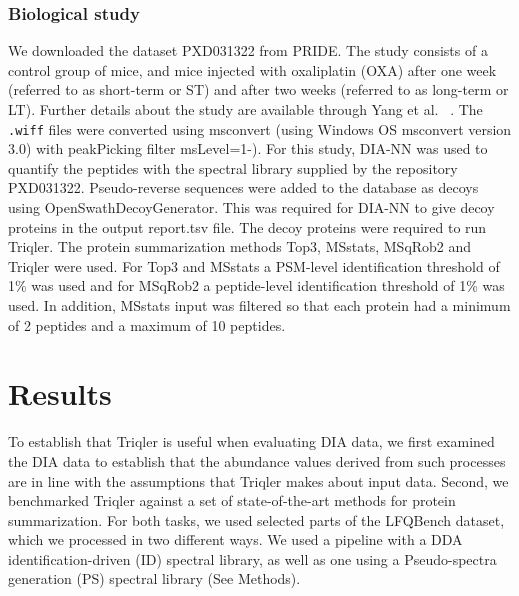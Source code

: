 \documentclass[10pt,letterpaper]{article}
\begin{document}

\subsubsection*{Biological study}

We downloaded the dataset PXD031322 from PRIDE. The study consists of a control group of mice, and mice injected with oxaliplatin (OXA) after one week (referred to as short-term or ST) and after two weeks (referred to as long-term or LT). Further details about the study are available through Yang et al. ~\cite{YANG2022104682}. The \verb|.wiff| files were converted using msconvert (using Windows OS msconvert version 3.0) with peakPicking filter msLevel=1-). For this study, DIA-NN was used to quantify the peptides with the spectral library supplied by the repository PXD031322. Pseudo-reverse sequences were added to the database as decoys using OpenSwathDecoyGenerator. This was required for DIA-NN to give decoy proteins in the output report.tsv file. The decoy proteins were required to run Triqler. The protein summarization methods Top3, MSstats, MSqRob2 and Triqler were used. For Top3 and MSstats a PSM-level identification threshold of 1\% was used and for MSqRob2 a peptide-level identification threshold of 1\% was used. In addition, MSstats input was filtered so that each protein had a minimum of 2 peptides and a maximum of 10 peptides. 

\section*{Results}

To establish that Triqler is useful when evaluating DIA data, we first examined the DIA data to establish that the abundance values derived from such processes are in line with the assumptions that Triqler makes about input data. Second, we benchmarked Triqler against a set of state-of-the-art methods for protein summarization. For both tasks, we used selected parts of the LFQBench dataset, which we processed in two different ways. We used a pipeline with a DDA identification-driven (ID) spectral library, as well as one using a Pseudo-spectra generation (PS) spectral library (See Methods).
\end{document}
